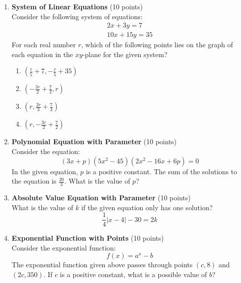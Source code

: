 \begin{enumerate}
  \item \textbf{System of Linear Equations} (10 points)\\
  Consider the following system of equations:
  \[
    \begin{gathered}
    2x + 3y = 7 \\
    10x + 15y = 35
    \end{gathered}
  \]
  For each real number $r$, which of the following points lies on the graph of each equation in the $xy$-plane for the given system?
  \begin{enumerate}[label=(\Alph*)]
    \item $\left(\frac{r}{5}+7,-\frac{r}{5}+35\right)$
    \item $\left(-\frac{3r}{2}+\frac{7}{2}, r\right)$
    \item $\left(r, \frac{2r}{3}+\frac{7}{3}\right)$
    \item $\left(r,-\frac{3r}{2}+\frac{7}{2}\right)$
  \end{enumerate}
  \begin{subanswer}
  \end{subanswer}

  \item \textbf{Polynomial Equation with Parameter} (10 points)\\
  Consider the equation:
  \[
    (3x + p)\left(5x^2 - 45\right)\left(2x^2 - 16x + 6p\right) = 0
  \]
  In the given equation, $p$ is a positive constant. The sum of 
  the solutions to the equation is $\frac{20}{3}$. What is the value of $p$?
  \begin{subanswer}
  \end{subanswer}

  \item \textbf{Absolute Value Equation with Parameter} (10 points)\\
  What is the value of $k$ if the given equation only has one solution?
  \[
    \frac{1}{4}|x-4|-30=2k
  \]
  \begin{subanswer}
  \end{subanswer}

  \item \textbf{Exponential Function with Points} (10 points)\\
  Consider the exponential function:
  \[
    f(x)=a^x-b
  \]
  The exponential function given above passes through points $(c, 8)$ and $(2c, 350)$. If $c$ is a positive constant, what is a possible value of $b$?
  \begin{subanswer}
  \end{subanswer}


\end{enumerate}
